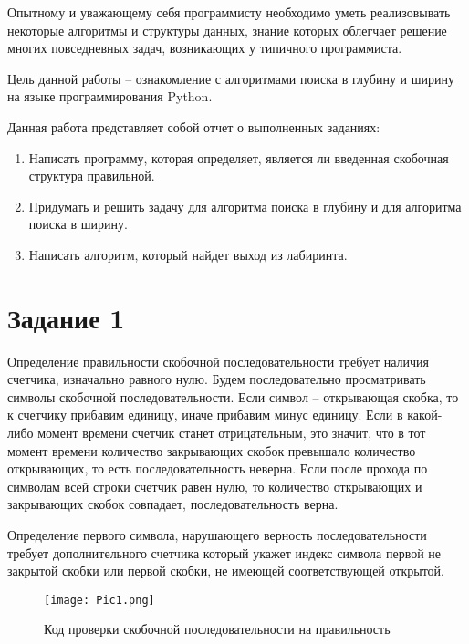 \documentclass[14pt]{extreport}
\begin{document}
\pagestyle{empty}

\pagestyle{plain}

\tableofcontents

\intro

Опытному и уважающему себя программисту необходимо уметь реализовывать некоторые алгоритмы и структуры данных, знание которых облегчает решение многих повседневных задач, возникающих у типичного программиста.

Цель данной работы – ознакомление с алгоритмами поиска в глубину и ширину на языке программирования Python.

Данная работа представляет собой отчет о выполненных заданиях:
\begin{enumerate}
\item Написать программу, которая определяет, является ли введенная скобочная структура правильной.
\item Придумать и решить задачу для алгоритма поиска в глубину и для алгоритма поиска в ширину.
\item Написать алгоритм, который найдет выход из лабиринта.
\end{enumerate}

\chapter{Задание 1}

Определение правильности скобочной последовательности требует наличия счетчика, изначально равного нулю. Будем последовательно просматривать символы скобочной последовательности. Если символ – открывающая скобка, то к счетчику прибавим единицу, иначе прибавим минус единицу. Если в какой-либо момент времени счетчик станет отрицательным, это значит, что в тот момент времени количество закрывающих скобок превышало количество открывающих, то есть последовательность неверна. Если после прохода по символам всей строки счетчик равен нулю, то количество открывающих и закрывающих скобок совпадает, последовательность верна. 

Определение первого символа, нарушающего верность последовательности требует дополнительного счетчика который укажет индекс символа первой не закрытой скобки или первой скобки, не имеющей соответствующей открытой.

\begin{figure}[H]
\centerline{\texttt{[image: Pic1.png]}}
\caption{Код проверки скобочной последовательности на правильность}
\label{fig11}
\end{figure}
\end{document}

